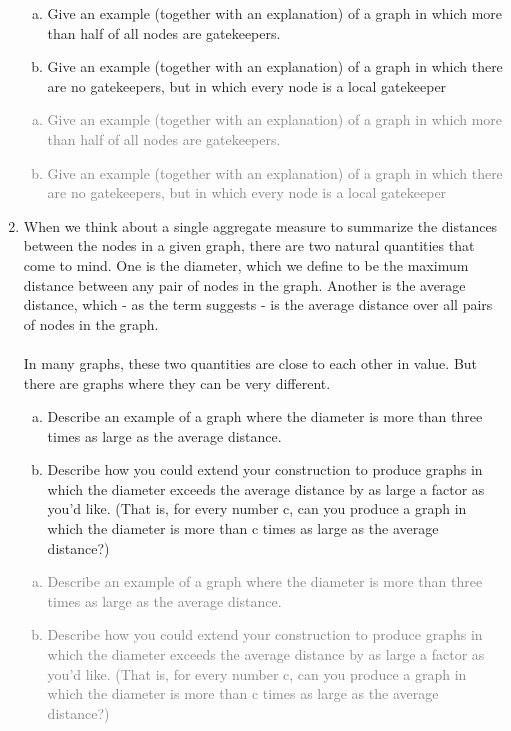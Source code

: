 \documentclass[11pt]{article}
\begin{document}
\begin{enumerate}
	\begin{enumerate}[(a)]
	\item Give an example (together with an explanation) of a graph in which more than half of all nodes are gatekeepers.
	\item Give an example (together with an explanation) of a graph in which there are no gatekeepers, but in which every node is a local gatekeeper
	\end{enumerate}
\textcolor{gray}{
\begin{enumerate}[(a)]
\item Give an example (together with an explanation) of a graph in which more than half of all nodes are gatekeepers.
\item Give an example (together with an explanation) of a graph in which there are no gatekeepers, but in which every node is a local gatekeeper
\end{enumerate}
}
\item When we think about a single aggregate measure to summarize the distances between the nodes in a given graph, there are two natural quantities that come to mind. One is the diameter, which we define to be the maximum distance between any pair of nodes in the graph. Another is the average distance, which - as the term suggests - is the average distance over all pairs of nodes in the graph.\\\\
In many graphs, these two quantities are close to each other in value. But there are graphs where they can be very different.\\
	\begin{enumerate}[(a)]
		\item Describe an example of a graph where the diameter is more than three times as large as the average distance.\\
		\item Describe how you could extend your construction to produce graphs in which the
diameter exceeds the average distance by as large a factor as you’d like. (That is, for every number c, can you produce a graph in which the diameter is more than c times as large as the average distance?)\\
	\end{enumerate}
\textcolor{gray}{
\begin{enumerate}[(a)]
\item Describe an example of a graph where the diameter is more than three times as large as the average distance.\\
\item Describe how you could extend your construction to produce graphs in which the diameter exceeds the average distance by as large a factor as you’d like. (That is, for every number c, can you produce a graph in which the diameter is more than c times as large as the average distance?)\\
\end{enumerate}
}
\end{enumerate}
\end{document}
